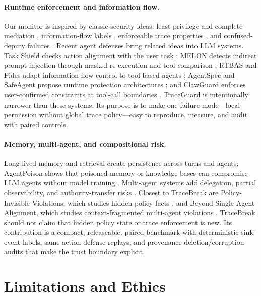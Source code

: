 \documentclass{article} %
\begin{document}
\paragraph{Runtime enforcement and information flow.}
Our monitor is inspired by classic security ideas: least privilege and complete
mediation \citep{saltzer1975protection}, information-flow labels
\citep{denning1976lattice}, enforceable trace properties
\citep{schneider2000enforceable}, and confused-deputy failures
\citep{hardy1988confused}. Recent agent defenses bring related ideas into LLM
systems. Task Shield checks action alignment with the user task
\citep{jia2024taskshield}; MELON detects indirect prompt injection through
masked re-execution and tool comparison \citep{zhu2025melon}; RTBAS and Fides
adapt information-flow control to tool-based agents \citep{zhong2025rtbas,costa2025fides};
AgentSpec and SafeAgent propose runtime protection architectures
\citep{wang2025agentspec,liu2026safeagent}; and ClawGuard enforces
user-confirmed constraints at tool-call boundaries \citep{zhao2026clawguard}.
TraceGuard is intentionally narrower than these systems. Its purpose is to make
one failure mode---local permission without global trace policy---easy to
reproduce, measure, and audit with paired controls.

\paragraph{Memory, multi-agent, and compositional risk.}
Long-lived memory and retrieval create persistence across turns and agents;
AgentPoison shows that poisoned memory or knowledge bases can compromise LLM
agents without model training \citep{chen2024agentpoison}. Multi-agent systems
add delegation, partial observability, and authority-transfer risks
\citep{schroederdewitt2025multiagentsecurity,hammond2025multiagentrisks}.
Closest to TraceBreak are Policy-Invisible Violations, which studies hidden
policy facts \citep{wu2026policyinvisible}, and Beyond Single-Agent Alignment,
which studies context-fragmented multi-agent violations
\citep{wu2026contextfragmented}. TraceBreak should not claim that hidden policy
state or trace enforcement is new. Its contribution is a compact, releaseable,
paired benchmark with deterministic sink-event labels, same-action defense
replays, and provenance deletion/corruption audits that make the trust boundary
explicit.

\section{Limitations and Ethics}
\end{document}
